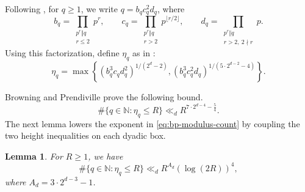 \documentclass[reqno,a4paper,11pt]{amsart}
\numberwithin{equation}{section}
\theoremstyle{plain}
\newtheorem{lemma}[theorem]{Lemma}
\theoremstyle{definition}
\begin{document}
Following \cite[Eq.~(3.12)]{bp}, for \(q\geq1\), we write \(q=b_qc_q^2d_q\), where
\[
 b_q=\prod_{\substack{p^r\Vert q\\r\leq2}}p^r,\qquad
 c_q=\prod_{\substack{p^r\Vert q\\r>2}}p^{\lfloor r/2\rfloor},\qquad
 d_q=\prod_{\substack{p^r\Vert q\\r>2,\ 2\nmid r}}p.
\]
Using this factorization, define \(\eta_q\) as in \cite[Eq.~(3.24)]{bp}:
\begin{equation}\label{eq:eta}
 \eta_q=\max\left\{
 (b_q^3c_qd_q^2)^{1/(2^d-2)},
 (b_q^3c_q^2d_q)^{1/(5\cdot2^{d-2}-4)}
 \right\}.
\end{equation}

Browning and Prendiville \cite[Lemma~4.4]{bp} prove the following bound.
\begin{equation}\label{eq:bp-modulus-count}
 \#\{q \in \mathbb{N}:\eta_q\leq R\}\ll_d
 R^{7\cdot2^{d-4}-\frac54}.
\end{equation}
The next lemma lowers the exponent in \eqref{eq:bp-modulus-count} by coupling the two height inequalities on each dyadic box.

\begin{lemma}\label{lem:moduli}
For \(R \geq 1\), we have
\[
 \#\{q \in \mathbb{N} :\eta_q\leq R\}\ll_d
 R^{A_d}(\log(2R))^4,
\]
where \(A_d=3\cdot2^{d-3}-1\).
\end{lemma}
\end{document}
